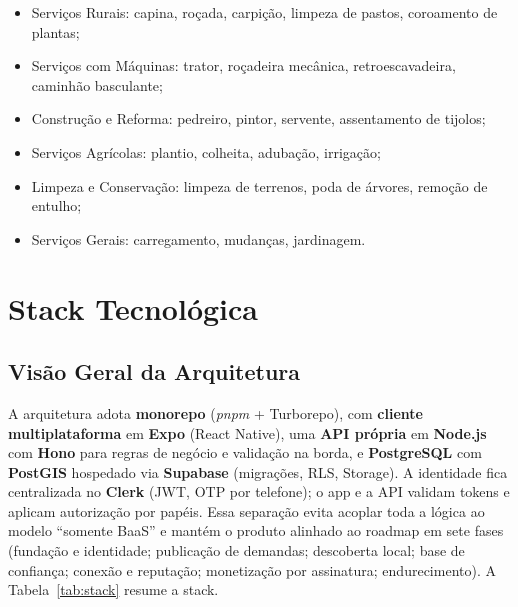 \documentclass[12pt, a4paper]{article}
\begin{document}
\begin{itemize}
  \item Serviços Rurais: capina, roçada, carpição, limpeza de pastos,
        coroamento de plantas;
  \item Serviços com Máquinas: trator, roçadeira mecânica,
        retroescavadeira, caminhão basculante;
  \item Construção e Reforma: pedreiro, pintor, servente, assentamento
        de tijolos;
  \item Serviços Agrícolas: plantio, colheita, adubação, irrigação;
  \item Limpeza e Conservação: limpeza de terrenos, poda de árvores,
        remoção de entulho;
  \item Serviços Gerais: carregamento, mudanças, jardinagem.
\end{itemize}

\section{Stack Tecnológica}

\subsection{Visão Geral da Arquitetura}

A arquitetura adota \textbf{monorepo} (\textit{pnpm} + Turborepo), com
\textbf{cliente multiplataforma} em \textbf{Expo} (React Native), uma
\textbf{API própria} em \textbf{Node.js} com \textbf{Hono} para regras de
negócio e validação na borda, e \textbf{PostgreSQL} com \textbf{PostGIS}
hospedado via \textbf{Supabase} (migrações, RLS, Storage). A identidade
fica centralizada no \textbf{Clerk} (JWT, OTP por telefone); o app e a API
validam tokens e aplicam autorização por papéis. Essa separação evita
acoplar toda a lógica ao modelo ``somente BaaS'' e mantém o produto
alinhado ao roadmap em sete fases (fundação e identidade; publicação de
demandas; descoberta local; base de confiança; conexão e reputação;
monetização por assinatura; endurecimento). A Tabela~\ref{tab:stack}
resume a stack.
\end{document}
